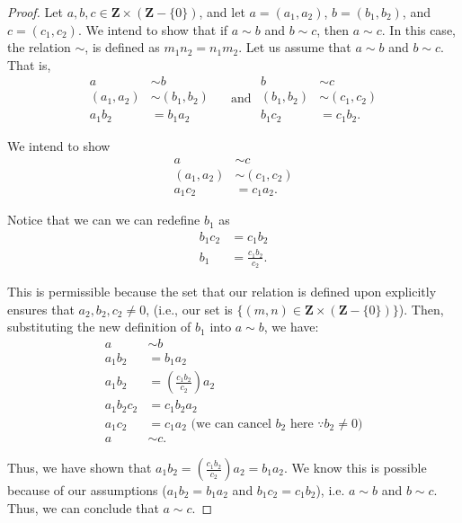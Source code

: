 \documentclass[12pt,oneside]{amsart}
\theoremstyle{remark}
\newcommand{\bfZ}{\mathbf{Z}}
\begin{document}
\begin{proof}
Let $a, b, c \in \bfZ \times (\bfZ - \{0\})$, and let $a = (a_1, a_2)$, $b = (b_1, b_2)$, and $c = (c_1, c_2)$. We intend to show that if $a \sim b$ and $b \sim c$, then $a \sim c$. In this case, the relation $\sim$, is defined as $m_1n_2 = n_1m_2$. Let us assume that $a \sim b$ and $b \sim c$. That is,
\begin{equation}
\begin{split}
         a &\sim b \\
(a_1, a_2) &\sim (b_1, b_2) \\
    a_1b_2 &= b_1a_2
\end{split}
\quad\text{ and }
\begin{split}
         b &\sim c \\
(b_1, b_2) &\sim (c_1, c_2) \\
    b_1c_2 &= c_1b_2.
\end{split}
\end{equation}

We intend to show
\begin{equation}
\begin{split}
         a &\sim c \\
(a_1, a_2) &\sim (c_1, c_2) \\
    a_1c_2 &= c_1a_2.
\end{split}
\end{equation}

Notice that we can we can redefine $b_1$ as
\begin{equation}
\begin{split}
b_1c_2 &= c_1b_2 \\
b_1 &= \frac{c_1b_2}{c_2}.
\end{split}
\end{equation}

This is permissible because the set that our relation is defined upon explicitly ensures that $a_2, b_2, c_2 \neq 0$, (i.e., our set is $\{(m, n) \in \bfZ \times (\bfZ - \{0\})\}$). Then, substituting the new definition of $b_1$ into $a \sim b$, we have:
\begin{equation}
\begin{split}
a &\sim b \\
a_1b_2 &= b_1a_2 \\
a_1b_2 &= (\frac{c_1b_2}{c_2})a_2 \\
a_1b_2c_2 &= c_1b_2a_2 \\
a_1c_2 &= c_1a_2 \text{ (we can cancel $b_2$ here $\because b_2 \neq 0$)} \\
a &\sim c.
\end{split}
\end{equation}

Thus, we have shown that $a_1b_2 = (\frac{c_1b_2}{c_2})a_2 = b_1a_2$. We know this is possible because of our assumptions ($a_1b_2 = b_1a_2$ and $b_1c_2 = c_1b_2$), i.e. $a \sim b$ and $b \sim c$. Thus, we can conclude that $a \sim c$.
\end{proof}
\end{document}
